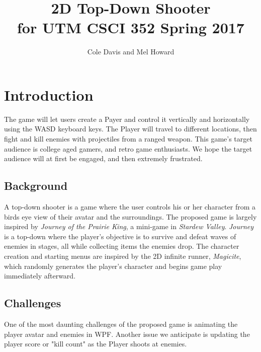 \documentclass[10pt,conference,onecolumn,compsoc]{IEEEtran}
\begin{document}
%
\title{2D Top-Down Shooter \\ for UTM CSCI 352 Spring 2017}

\author{Cole Davis and Mel Howard}



\maketitle


\IEEEdisplaynontitleabstractindextext

\IEEEpeerreviewmaketitle



\section{Introduction}
The game will let users create a Payer and control it vertically and horizontally using the WASD keyboard keys. The Player will travel to different locations, then fight and kill enemies with projectiles from a ranged weapon. This game's target audience is college aged gamers, and retro game enthusiasts. We hope the target audience will at first be engaged, and then extremely frustrated.


\subsection{Background}
A top-down shooter is a game where the user controls his or her character from a birds eye view of their avatar and the surroundings. The proposed game is largely inspired  by \textit{Journey of the Prairie King}, a mini-game in \textit{Stardew Valley}. \textit{Journey} is a top-down where the player's objective is to survive and defeat waves of enemies in stages, all while collecting items the enemies drop. The character creation and starting menus are inspired by the 2D infinite runner, \textit{Magicite}, which randomly generates the player's character and begins game play immediately afterward.

\subsection{Challenges}
One of the most daunting challenges of the proposed game is animating the player avatar and enemies in WPF.
Another issue we anticipate is updating the player score or "kill count" as the Player shoots at enemies.
\end{document}
